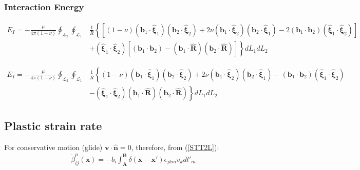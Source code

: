 \subsubsection{Interaction Energy}

\begin{align}
E_I=-\frac{\mu}{4\pi(1-\nu)}\oint_{\mathcal{L}_{2}}\oint_{\mathcal{L}_{1}}&\frac{1}{R}\left\{\left[(1-\nu)\left(\bm b_{1}\cdot\hat{\bm \xi}_1\right)\left(\bm b_{2}\cdot\hat{\bm \xi}_{2}\right)
+2\nu\left( \bm b_1\cdot\hat{\bm \xi}_2\right)\left(\bm b_2\cdot\hat{\bm \xi}_1\right)
-2\left(\bm b_1\cdot{\bm b}_2\right)\left( \hat{\bm\xi}_1\cdot\hat{\bm \xi}_2\right)
\right]\right.\nonumber\\
&\left.+\left( \hat{\bm\xi}_1\cdot\hat{\bm \xi}_2\right) \left[\left(\bm b_1\cdot\bm b_2\right)-\left(\bm b_1\cdot\hat{\bm R}\right)\left(\bm b_2\cdot\hat{\bm R}\right)\right]\right\} dL_{1} dL_{2}
\label{interaction_energy_loop_vector_expanded}
\end{align}

\begin{align}
E_I=-\frac{\mu}{4\pi(1-\nu)}\oint_{\mathcal{L}_{2}}\oint_{\mathcal{L}_{1}}&\frac{1}{R}\left\{(1-\nu)\left(\bm b_{1}\cdot\hat{\bm \xi}_1\right)\left(\bm b_{2}\cdot\hat{\bm \xi}_{2}\right)
+2\nu\left( \bm b_1\cdot\hat{\bm \xi}_2\right)\left(\bm b_2\cdot\hat{\bm \xi}_1\right)
-\left(\bm b_1\cdot{\bm b}_2\right)\left( \hat{\bm\xi}_1\cdot\hat{\bm \xi}_2\right)
\right.\nonumber\\
&\left. -\left( \hat{\bm\xi}_1\cdot\hat{\bm \xi}_2\right)\left(\bm b_1\cdot\hat{\bm R}\right)\left(\bm b_2\cdot\hat{\bm R}\right)\right\} dL_{1} dL_{2}
\label{interaction_energy_loop_vector}
\end{align}










\subsection{Plastic strain rate}

For conservative motion (glide) $\bm v\cdot\hat{\bm n}=0$, therefore, from (\ref{STT2L}):
\begin{align}
\dot\beta^p_{ij}(\bm x)=-b_i\int_{\bm A}^{\bm B}\delta(\bm x-\bm x')\epsilon_{jkm}v_kdl'_m
\end{align}







